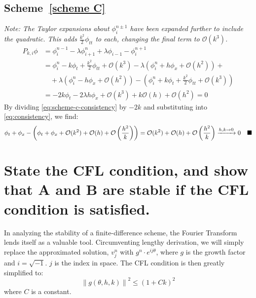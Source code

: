 \documentclass{hw_report}
\begin{document}
    \subsection*{Scheme~\ref{scheme C}}
    \textit{Note: The Taylor expansions about $\phi_i^{n\pm 1}$ have been expanded further to include the quadratic. This adds $\frac{k^2}{2}\phi_{tt}$ to each, changing the final term to $\mathcal{O}(k^3)$.}
    \begin{equation}
        \label{eq:scheme-c-consistency}
        \begin{split}
            P_{k,i}\phi &= \phi_i^{n-1}-\lambda\phi_{i+1}^n+\lambda\phi_{i-1}-\phi_i^{n+1}\\
            &=\phi_i^n-k\phi_t+\frac{k^2}{2}\phi_{tt}+\mathcal{O}(k^3)-\lambda\left( \phi_i^n+h\phi_x+\mathcal{O}(h^2) \right) +\\ &\quad + \lambda\left( \phi_i^n-h\phi_x+\mathcal{O}(h^2) \right) - \left( \phi_i^n+k\phi_t+\frac{k^2}{2}\phi_{tt}+\mathcal{O}(k^3) \right) \\
            &=-2k\phi_t-2\lambda h\phi_x+\mathcal{O}(k^3)+k\mathcal{O}(h)+\mathcal{O}(h^2)=0
        \end{split}
    \end{equation}
    By dividing \cref{eq:scheme-c-consistency} by $-2k$ and substituting into \cref{eq:consistency}, we find:
    \begin{equation*}
        \phi_t+\phi_x-\left( \phi_t+\phi_x+\mathcal{O}(k^2)+\mathcal{O}(h) +\mathcal{O}\left(\frac{h^2}{k}\right) \right) = \mathcal{O}(k^2)+\mathcal{O}(h)+\mathcal{O}\left(\frac{h^2}{k}\right)\xrightarrow{h,k\to 0} 0 \quad \blacksquare
    \end{equation*}


    \section{{State the CFL condition, and show that \textbf{A} and \textbf{B} are stable if the CFL condition is satisfied.}} \label{sec:q2}
    In analyzing the stability of a finite-difference scheme, the Fourier Transform lends itself as a valuable tool.
    Circumventing lengthy derivation, we will simply replace the approximated solution, $v_j^n$ with $g^n \cdot e^{ij\theta}$, where $g$ is the growth factor and $i=\sqrt {-1}$. $j$ is the index in space.
    The CFL condition is then greatly simplified to:
    \begin{equation}
        \label{eq:cfl-condition}
        \left\| g(\theta,h,k) \right\|^2 \leq \left( 1+Ck \right)^2
    \end{equation}
    where $C$ is a constant.
\end{document}
